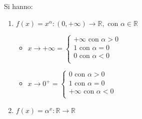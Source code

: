 \documentclass[a4paper,12pt, oneside]{book}
\begin{document}
\newpage
\begin{shaded}
	\begin{nota}
		Si hanno:
		\begin{enumerate}
			\item $f(x)=x^\alpha : (0,+\infty)\rightarrow \mathbb{R}, \mbox{ con }\alpha \in \mathbb{R}$
			      \begin{itemize}
				      \item $x\rightarrow +\infty=\left\{
					            \begin{array}{ll}
						            +\infty \mbox{ con } \alpha>0 \\
						            1 \mbox{ con } \alpha=0       \\
						            0 \mbox{ con } \alpha<0       \\
					            \end{array}
					            \right.$
				      \item $x\rightarrow 0^{+}=\left\{
					            \begin{array}{ll}
						            0 \mbox{ con } \alpha>0       \\
						            1 \mbox{ con } \alpha=0       \\
						            +\infty \mbox{ con } \alpha<0 \\
					            \end{array}
					            \right.$
			      \end{itemize}
			\item $f(x)=\alpha^x : \mathbb{R}\rightarrow \mathbb{R}$
\end{enumerate}
\end{nota}
\end{shaded}
\end{document}
